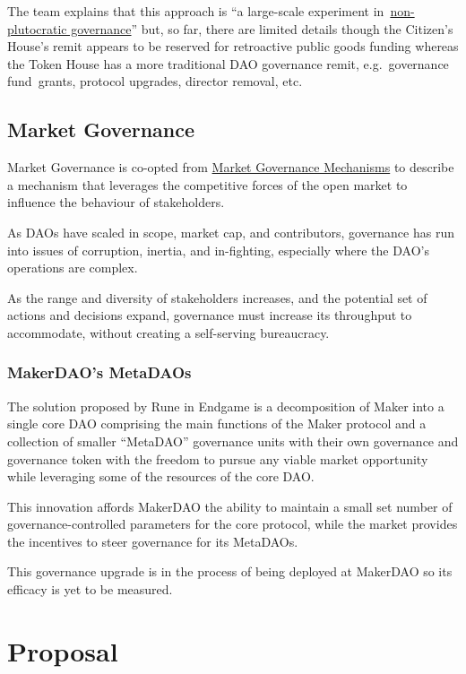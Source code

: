 \documentclass[
]{article}
\begin{document}
The team explains that this approach is ``a large-scale experiment
in~\href{https://vitalik.ca/general/2021/08/16/voting3.html}{non-plutocratic
governance}'' but, so far, there are limited details though the
Citizen's House's remit appears to be reserved for retroactive public
goods funding whereas the Token House has a more traditional DAO
governance remit, e.g.~governance fund~grants, protocol upgrades,
director removal, etc.

\hypertarget{market-governance}{%
\subsection{Market Governance}\label{market-governance}}

Market Governance is co-opted from
\href{https://en.wikipedia.org/wiki/Market_governance_mechanism}{Market
Governance Mechanisms} to describe a mechanism that leverages the
competitive forces of the open market to influence the behaviour of
stakeholders.

As DAOs have scaled in scope, market cap, and contributors, governance
has run into issues of corruption, inertia, and in-fighting, especially
where the DAO's operations are complex.

As the range and diversity of stakeholders increases, and the potential
set of actions and decisions expand, governance must increase its
throughput to accommodate, without creating a self-serving bureaucracy.

\hypertarget{makerdaos-metadaos}{%
\subsubsection{MakerDAO's MetaDAOs}\label{makerdaos-metadaos}}

The solution proposed by Rune in Endgame is a decomposition of Maker
into a single core DAO comprising the main functions of the Maker
protocol and a collection of smaller ``MetaDAO'' governance units with
their own governance and governance token with the freedom to pursue any
viable market opportunity while leveraging some of the resources of the
core DAO.

This innovation affords MakerDAO the ability to maintain a small set
number of governance-controlled parameters for the core protocol, while
the market provides the incentives to steer governance for its MetaDAOs.

This governance upgrade is in the process of being deployed at MakerDAO
so its efficacy is yet to be measured.
\hypertarget{proposal}{%
\section{Proposal}\label{proposal}}
\end{document}

